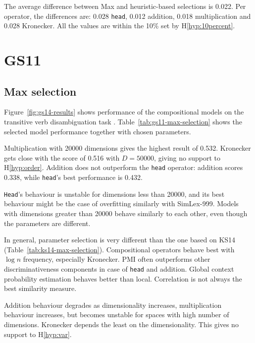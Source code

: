 The average difference between Max and heuristic-based selections is 0.022. Per operator, the differences are: 0.028 \texttt{head}, 0.012 addition, 0.018 multiplication and 0.028 Kronecker. All the values are within the 10\% set by H\ref{hyp:10percent}.

\section{GS11}
\label{sec:gs11}


\subsection{Max selection}
\label{sec:max-selection-gs11}



Figure~\ref{fig:gs14-results} shows performance of the compositional models on the transitive verb disambiguation task \cite{Grefenstette:2011:ESC:2145432.2145580}. Table~\ref{tab:gs11-max-selection} shows the selected model performance together with chosen parameters.

Multiplication with 20000 dimensions gives the highest result of 0.532. Kronecker gets close with the score of 0.516 with $D = 50000$, giving no support to H\ref{hyp:order}. Addition does not outperform the \texttt{head} operator: addition scores 0.338, while \texttt{head}'s best performance is 0.432.

\texttt{Head}'s behaviour is unstable for dimensions less than 20000, and its best behaviour might be the case of overfitting similarly with SimLex-999. Models with dimensions greater than 20000 behave similarly to each other, even though the parameters are different.

In general, parameter selection is very different than the one based on KS14 (Table~\ref{tab:ks14-max-selection}). Compositional operators behave best with $\log n$ frequency, especially Kronecker. PMI often outperforms other discriminativeness components in case of \texttt{head} and addition. Global context probability estimation behaves better than local. Correlation is not always the best similarity measure.

Addition behaviour degrades as dimensionality increases, multiplication behaviour increases, but becomes unstable for spaces with high number of dimensions. Kronecker depends the least on the dimensionality. This gives no support to H\ref{hyp:var}.

